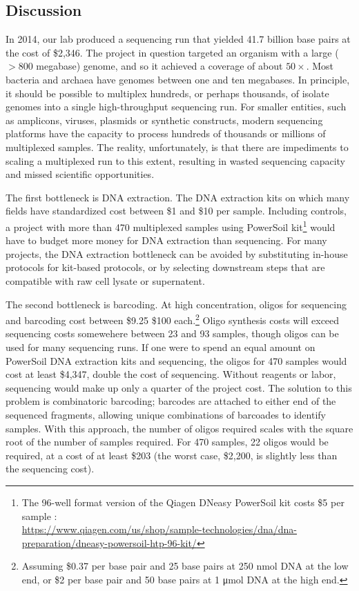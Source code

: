 \begin{refsection}
\section{Discussion}

In 2014, our lab produced a sequencing run that yielded 41.7 billion base pairs at the cost of \$2,346. The project in question targeted an organism with a large ($>800$ megabase) genome, and so it achieved a coverage of about $50\times$. Most bacteria and archaea have genomes between one and ten megabases. In principle, it should be possible to multiplex hundreds, or perhaps thousands, of isolate genomes into a single high-throughput sequencing run. For smaller entities, such as amplicons, viruses, plasmids or synthetic constructs, modern sequencing platforms have the capacity to process hundreds of thousands or millions of multiplexed samples. The reality, unfortunately, is that there are impediments to scaling a multiplexed run to this extent, resulting in wasted sequencing capacity and missed scientific opportunities.

The first bottleneck is DNA extraction. The DNA extraction kits on which many fields have standardized cost between \$1 and \$10 per sample. Including controls, a project with more than 470 multiplexed samples using PowerSoil kit\footnote{The 96-well format version of the Qiagen DNeasy PowerSoil kit costs \$5 per sample :\\ \url{https://www.qiagen.com/us/shop/sample-technologies/dna/dna-preparation/dneasy-powersoil-htp-96-kit/}} would have to budget more money for DNA extraction than sequencing. For many projects, the DNA extraction bottleneck can be avoided by substituting in-house protocols for kit-based protocols, or by selecting downstream steps that are compatible with raw cell lysate or supernatent.

The second bottleneck is barcoding. At high concentration, oligos for sequencing and barcoding cost between \$9.25 \$100 each.\footnote{Assuming \$0.37 per base pair and 25 base pairs at 250 \si{\nano\mole} DNA at the low end, or \$2 per base pair and 50 base pairs at 1 \si{\micro\mole} DNA at the high end.} Oligo synthesis costs will exceed sequencing costs somewehere between 23 and 93 samples, though oligos can be used for many sequencing runs. If one were to spend an equal amount on PowerSoil DNA extraction kits and sequencing, the oligos for 470 samples would cost at least \$4,347, double the cost of sequencing. Without reagents or labor, sequencing would make up only a quarter of the project cost. The solution to this problem is combinatoric barcoding; barcodes are attached to either end of the sequenced fragments, allowing unique combinations of barcoades to identify samples. With this approach, the number of oligos required scales with the square root of the number of samples required. For 470 samples, 22 oligos would be required, at a cost of at least \$203 (the worst case, \$2,200, is slightly less than the sequencing cost).


\end{refsection}
